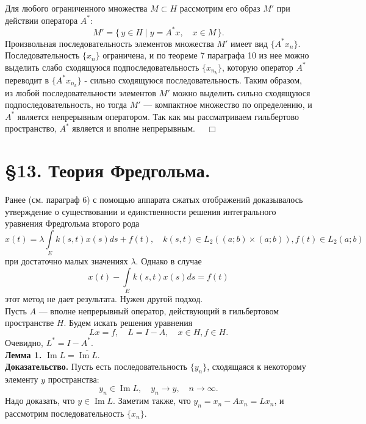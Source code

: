 \documentclass[12pt,a4paper, titlepage]{article}
\renewcommand{\Im}{\mathop{\mathrm{Im}}\nolimits}
\begin{document}
Для любого ограниченного множества $M \subset H$ рассмотрим его образ $M'$ при действии оператора $A^*$:
$$
M' = \{\,y \in H \mid y = A^*x, \quad x \in M\,\}.
$$
Произвольная последовательность элементов множества $M'$ имеет вид $\{A^*x_n\}$. Последовательность $\{x_n\}$ ограничена, и по теореме 7 параграфа 10 из нее можно выделить слабо сходящуюся подпоследовательность $\{x_{n_k}\}$, которую оператор $A^*$ переводит в $\{A^*x_{n_k}\}$ - сильно сходящуюся последовательность. Таким образом, из любой последовательности элементов $M'$ можно выделить сильно сходящуюся подпоследовательность, но тогда $M'$ --- компактное множество по определению, и $A^*$ является непрерывным оператором. Так как мы рассматриваем гильбертово пространство, $A^*$ является и вполне непрерывным. $\quad \Box$\\


\section*{ \S 13. Теория Фредгольма.}

Ранее (см. параграф 6) с помощью аппарата сжатых отображений доказывалось утверждение о существовании и единственности решения интегрального уравнения Фредгольма второго рода
$$
x(t) = \lambda \int\limits_E k(s,t) x(s) ds + f(t), \quad k(s, t) \in L_2((a;b) \times (a;b)), f(t) \in L_2(a;b)
$$
при достаточно малых значениях $\lambda$. Однако в случае
$$
x(t) - \int\limits_E k(s,t) x(s) ds = f(t)
$$
этот метод не дает результата. Нужен другой подход.\\

Пусть $A$ --- вполне непрерывный оператор, действующий в гильбертовом пространстве $H$. Будем искать решения уравнения 
$$
Lx = f, \quad L = I - A, \quad x \in H, f \in H.
$$
Очевидно, $L^* = I - A^*$.\\

\textbf{Лемма 1.} $\Im L = \overline{\Im L}$.\\
\textbf{Доказательство.} Пусть есть последовательность $\{y_n\}$, сходящаяся к некоторому элементу $y$ пространства:
$$
y_n \in \Im L, \quad y_n \to y, \quad n \to \infty.
$$
Надо доказать, что $y \in \Im L$. Заметим также, что $y_n = x_n - Ax_n = Lx_n$, и рассмотрим последовательность $\{x_n\}$.\\
\end{document}
